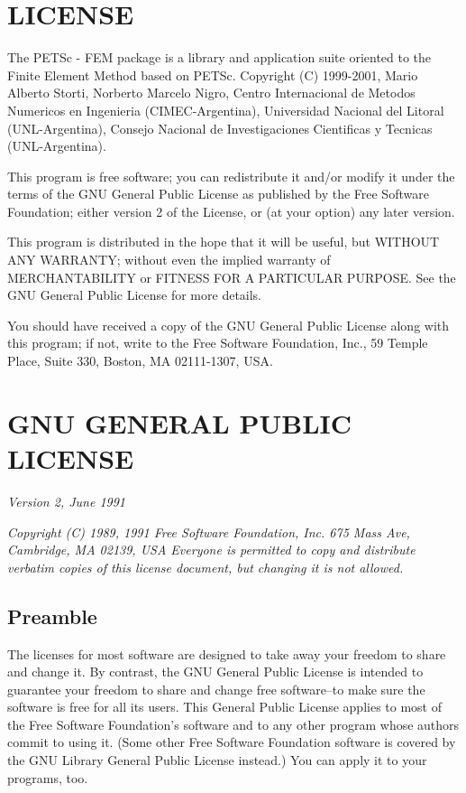 \section{LICENSE}

The PETSc - FEM package is a library and application suite oriented to
the Finite Element Method based on PETSc.  Copyright (C) 1999-2001,
Mario Alberto Storti, Norberto Marcelo Nigro, Centro Internacional de
Metodos Numericos en Ingenieria (CIMEC-Argentina), Universidad
Nacional del Litoral (UNL-Argentina), Consejo Nacional de
Investigaciones Cientificas y Tecnicas (UNL-Argentina).
  
This program is free software; you can redistribute it and/or
modify it under the terms of the GNU General Public License
as published by the Free Software Foundation; either version 2
of the License, or (at your option) any later version.

This program is distributed in the hope that it will be useful,
but WITHOUT ANY WARRANTY; without even the implied warranty of
MERCHANTABILITY or FITNESS FOR A PARTICULAR PURPOSE.  See the
GNU General Public License for more details.

You should have received a copy of the GNU General Public License along
with this program; if not, write to the Free Software Foundation, Inc.,
59 Temple Place, Suite 330, Boston, MA 02111-1307, USA.

\section{GNU GENERAL PUBLIC LICENSE}

\emph{Version 2, June 1991}

\emph{Copyright (C) 1989, 1991 Free Software Foundation, Inc.
675 Mass Ave, Cambridge, MA 02139, USA Everyone is permitted to copy
and distribute verbatim copies of this license document, but changing
it is not allowed.}

\subsection{Preamble}

The licenses for most software are designed to take away your freedom
to share and change it.  By contrast, the GNU General Public License
is intended to guarantee your freedom to share and change free
software--to make sure the software is free for all its users.  This
General Public License applies to most of the Free Software
Foundation's software and to any other program whose authors commit to
using it.  (Some other Free Software Foundation software is covered by
the GNU Library General Public License instead.)  You can apply it to
your programs, too.

